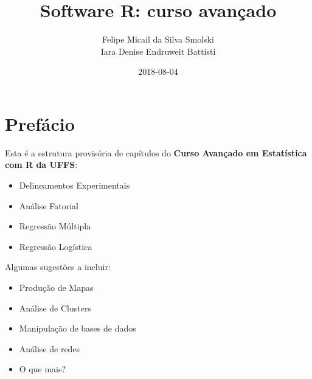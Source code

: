 \documentclass[12pt,brazil,]{book}
\title{Software R: curso avançado}
\author{Felipe Micail da Silva Smolski \\ Iara Denise Endruweit Battisti}
\date{2018-08-04}
\providecommand{\tightlist}{%
  \setlength{\itemsep}{0pt}\setlength{\parskip}{0pt}}
\begin{document}
\maketitle

{
\setcounter{tocdepth}{1}
\tableofcontents
}
\hypertarget{prefacio}{%
\chapter*{Prefácio}\label{prefacio}}

Esta é a estrutura provisória de capítulos do \textbf{Curso Avançado em
Estatística com R da UFFS}:

\begin{itemize}
\tightlist
\item
  Delineamentos Experimentais
\item
  Análise Fatorial
\item
  Regressão Múltipla
\item
  Regressão Logística
\end{itemize}

Algumas sugestões a incluir:

\begin{itemize}
\tightlist
\item
  Produção de Mapas
\item
  Análise de Clusters
\item
  Manipulação de bases de dados
\item
  Análise de redes
\item
  O que mais?
\end{itemize}
\end{document}
